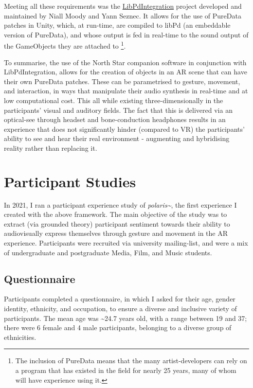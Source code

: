 Meeting all these requirements was the \href{https://github.com/LibPdIntegration/LibPdIntegration}{LibPdIntegration} project developed and maintained by Niall Moody and Yann Seznec. It allows for the use of PureData patches in Unity, which, at run-time, are compiled to libPd (an embeddable version of PureData), and whose output is fed in real-time to the sound output of the GameObjects they are attached to  \footnote{The inclusion of PureData means that the many artist-developers can rely on a program that has existed in the field for nearly 25 years, many of whom will have experience using it.}.

To summarise, the use of the North Star companion software in conjunction with LibPdIntegration, allows for the creation of objects in an AR scene that can have their own PureData patches. These can be parametrised to gesture, movement, and interaction, in ways that manipulate their audio synthesis in real-time and at low computational cost. This all while existing three-dimensionally in the participants' visual and auditory fields. The fact that this is delivered via an optical-see through headset and bone-conduction headphones results in an experience that does not significantly hinder (compared to VR) the participants' ability to see and hear their real environment - augmenting and hybridising reality rather than replacing it.



\section{Participant Studies}\label{sec: polaris-study}
In 2021, I ran a participant experience study of \textit{polaris\textasciitilde{}}, the first experience I created with the above framework. The main objective of the study was to extract (via grounded theory) participant sentiment towards their ability to audiovisually express themselves through gesture and movement in the AR experience. Participants were recruited via university mailing-list, and were a mix of undergraduate and postgraduate Media, Film, and Music students.

\subsection{Questionnaire}\label{sec: polaris-study-questionnaire}
Participants completed a questionnaire, in which I asked for their age, gender identity, ethnicity, and occupation, to ensure a diverse and inclusive variety of participants. The mean age was \textasciitilde{}24.7 years old, with a range between 19 and 37; there were 6 female and 4 male participants, belonging to a diverse group of ethnicities.

